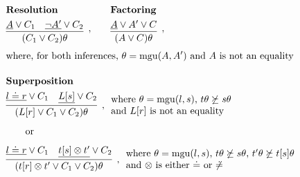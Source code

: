 \begin{figure}[ht]
  \begin{equation*}
    \begin{aligned}
      &
      \begin{aligned}
        &
        \begin{aligned}
          \begin{aligned}
            &\text{\textbf{Resolution}}\\
            &\infer[,]{(C_1\vee C_2)\theta}{\underline{A} \vee C_1 & \underline{\neg A'} \vee C_2}
          \end{aligned}
          &\quad\quad
          \begin{aligned}
            &\text{\textbf{Factoring}}\\
            &\infer[,]{(A \vee C)\theta}{\underline{A} \vee A' \vee C}
          \end{aligned}
        \end{aligned}
        \\[0.25em]
        &\text{where, for both inferences, $\theta=\mathrm{mgu}(A,A')$ and $A$ is not an equality}
      \end{aligned}
      \\[1em]
      &
      \begin{aligned}
        &\text{\textbf{Superposition}}
        \\
        &
        \infer[, \begin{array}{l}\text{where $\theta=\mathrm{mgu}(l,s)$, $t\theta\not\succeq s\theta$}\\\text{and $L[r]$ is not an equality}\end{array}]{(L[r] \vee C_1 \vee C_2)\theta}{\underline{l \eql r} \vee C_1 & \underline{L[s]} \vee C_2}
        \\[0.5em]
        &
        \quad\quad\text{or}
        \\[0.4em]
        &
        \infer[, \begin{array}{l}\text{where $\theta=\mathrm{mgu}(l,s)$, $t\theta\not\succeq s\theta$, $t'\theta\not\succeq t[s]\theta$}\\\text{and $\otimes$ is either $\eql$ or $\not\eql$}\end{array}]{(t[r] \otimes t' \vee C_1 \vee C_2)\theta}{\underline{l \eql r} \vee C_1 & \underline{t[s] \otimes t'} \vee C_2}
      \end{aligned}
      \\[1em]
      &
      \begin{aligned}
        \begin{aligned}

\end{aligned}
\end{aligned}
\end{aligned}
\end{equation*}
\end{figure}
